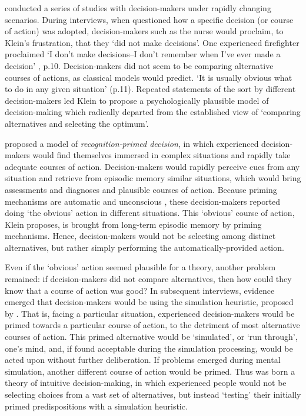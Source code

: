 \citet{klein1999sources} conducted a series of studies with decision-makers under rapidly changing scenarios. During interviews, when questioned how a specific decision (or course of action) was adopted, decision-makers such as the nurse would proclaim, to Klein's frustration, that they `did not make decisions'.  One experienced firefighter proclaimed `I don't make decisions--I don't remember when I've ever made a decision' \citep{klein1999sources}, p.10.   Decision-makers did not seem to be comparing alternative courses of actions, as classical models would predict.  `It is usually obvious what to do in any given situation' (p.11).  Repeated statements of the sort by different decision-makers led Klein to propose a psychologically plausible model of decision-making which radically departed from the established view of `comparing alternatives and selecting the optimum'.

\citet{klein1999sources} proposed a model of \emph{recognition-primed decision}, in which experienced decision-makers would find themselves immersed in complex situations and rapidly take adequate courses of action.  Decision-makers would rapidly perceive cues from any situation and retrieve from episodic memory similar situations, which would bring assessments and diagnoses and plausible courses of action.  Because priming mechanisms are automatic and unconscious \citep{bargh1999unbearable, bargh2001automated}, these decision-makers reported doing `the obvious' action in different situations.  This `obvious' course of action, Klein proposes, is brought from long-term episodic memory by priming mechanisms.  Hence, decision-makers would not be selecting among distinct alternatives, but rather simply performing the automatically-provided action.

Even if the `obvious' action seemed plausible for a theory, another problem remained:  if decision-makers did not compare alternatives, then how could they know that a course of action was good?  In subsequent interviews, evidence emerged that decision-makers would be using the simulation heuristic, proposed by \citet{kahneman1982simulation}.  That is, facing a particular situation, experienced decision-makers would be primed towards a particular course of action, to the detriment of most alternative courses of action.  This primed alternative would be `simulated', or `run through', one's mind, and, if found acceptable during the simulation processing, would be acted upon without further deliberation.  If problems emerged during mental simulation, another different course of action would be primed. Thus was born a theory of intuitive decision-making, in which experienced people would not be selecting choices from a vast set of alternatives, but instead `testing' their initially primed predispositions with a simulation heuristic.

